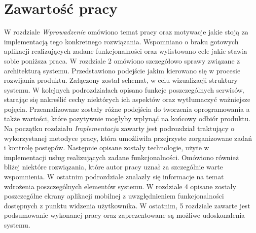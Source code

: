 \section{Zawartość pracy}
\label{sec:zawartoscPracy}
W rozdziale \textit{Wprowadzenie} omówiono temat pracy oraz motywacje jakie stoją za implementacją tego konkretnego rozwiązania. Wspomniano o braku gotowych aplikacji realizujących zadane funkcjonalności oraz wylistowano cele jakie stawia sobie poniższa praca.\newline
W rozdziale 2 omówiono szczegółowo sprawy związane z architekturą systemu. Przedstawiono podejście jakim kierowano się w procesie rozwijania produktu. Załączony został schemat, w celu wizualizacji struktury systemu. W kolejnych podrozdziałach opisano funkcje poszczególnych serwisów, starając się nakreślić cechy niektórych ich aspektów oraz wytłumaczyć ważniejsze pojęcia. Przeanalizowane zostały różne podejścia do tworzenia oprogramowania a także wartości, które pozytywnie mogłyby wpłynąć na końcowy odbiór produktu.\newline
Na początku rozdziału \textit{Implementacja} zawarty jest podrozdział traktujący o wykorzystanej metodyce pracy, która umożliwiła przejrzyste zorganizowane zadań i kontrolę postępów. Następnie opisane zostały technologie, użyte w implementacji usług realizujących zadane funkcjonalności. Omówiono również bliżej niektóre rozwiązania, które autor pracy uznał za szczególnie warte wspomnienia. W ostatnim podrozdziale znalazły się informacje na temat wdrożenia poszczególnych elementów systemu.\newline
W rozdziale 4 opisane zostały poszczególne ekrany aplikacji mobilnej z uwzględnieniem funkcjonalności dostępnych z punktu widzenia użytkownika.\newline
W ostatnim, 5 rozdziale zawarte jest podsumowanie wykonanej pracy oraz zaprezentowane są możliwe udoskonalenia systemu.

